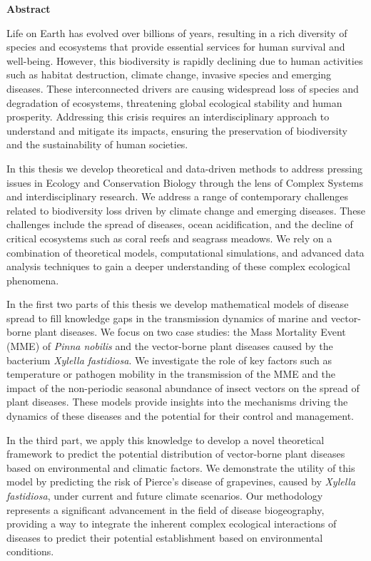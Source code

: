 \pagebreak
\thispagestyle{empty}

\begin{center}
    \textbf{\Large Abstract}
\end{center}

Life on Earth has evolved over billions of years, resulting in a rich
diversity of species and ecosystems that provide essential services for
human survival and well-being. However, this biodiversity is rapidly
declining due to human activities such as habitat destruction, climate
change, invasive species and emerging diseases. These interconnected
drivers are causing widespread loss of species and degradation of
ecosystems, threatening global ecological stability and human prosperity.
Addressing this crisis requires an interdisciplinary approach to understand
and mitigate its impacts, ensuring the preservation of biodiversity and the
sustainability of human societies.

In this thesis we develop theoretical and data-driven methods
to address pressing issues in Ecology and Conservation Biology through the
lens of Complex Systems and interdisciplinary research. We address a
range of contemporary challenges related to biodiversity loss driven by
climate change and emerging diseases. These challenges include the spread
of diseases, ocean acidification, and the decline of critical ecosystems such
as coral reefs and seagrass meadows. We rely on a combination of theoretical
models, computational simulations, and advanced data analysis techniques to
gain a deeper understanding of these complex ecological phenomena.

In the first two parts of this thesis we develop mathematical models of
disease spread to fill knowledge gaps in the transmission dynamics of
marine and vector-borne plant diseases. We focus on two case studies: the
Mass Mortality Event (MME) of \textit{Pinna nobilis} and the vector-borne plant
diseases caused by the bacterium \textit{Xylella fastidiosa}. We investigate
the role of key factors such as temperature or pathogen mobility in the
transmission of the MME and the impact of the non-periodic seasonal abundance
of insect vectors on the spread of plant diseases. These models provide
insights into the mechanisms driving the dynamics of these diseases and the
potential for their control and management.

In the third part, we apply this knowledge to develop a novel
theoretical framework to predict the potential distribution of
vector-borne plant diseases based on environmental and climatic factors. We
demonstrate the utility of this model by predicting the risk of Pierce's
disease of grapevines, caused by \textit{Xylella fastidiosa}, under current
and future climate scenarios. Our methodology represents a significant
advancement in the field of disease biogeography, providing a way to
integrate the inherent complex ecological interactions of diseases to predict
their potential establishment based on environmental conditions.

